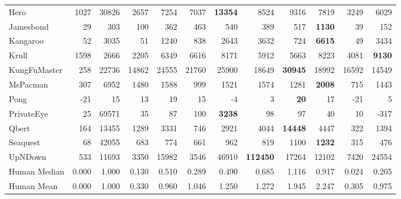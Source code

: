 \begin{tabular}{l|rr|rrrrrrrr|r}
    Hero           & 1027   & 30826 & 2657   & 7254  & 7037  & \bf 13354 & 8524       & 9316      & 7819      & 3249      & 6029     \\
    Jamesbond      & 29     & 303   & 100    & 362   & 463   & 540       & 389        & 517       & \bf 1130  & 39        & 152      \\
    Kangaroo       & 52     & 3035  & 51     & 1240  & 838   & 2643      & 3632       & 724       & \bf 6615  & 49        & 3434     \\
    Krull          & 1598   & 2666  & 2205   & 6349  & 6616  & 8171      & 5912       & 5663      & 8223      & 4081      & \bf 9130 \\
    KungFuMaster   & 258    & 22736 & 14862  & 24555 & 21760 & 25900     & 18649      & \bf 30945 & 18992     & 16592     & 14549    \\
    MsPacman       & 307    & 6952  & 1480   & 1588  & 999   & 1521      & 1574       & 1281      & \bf 2008  & 715       & 1443     \\
    Pong           & -21    & 15    & 13     & 19    & 15    & -4        & 3          & \bf 20    & 17        & -21       & 5        \\
    PrivateEye     & 25     & 69571 & 35     & 87    & 100   & \bf 3238  & 98         & 97        & 40        & 10        & -317     \\
    Qbert          & 164    & 13455 & 1289   & 3331  & 746   & 2921      & 4044       & \bf 14448 & 4447      & 322       & 1394     \\
    Seaquest       & 68     & 42055 & 683    & 774   & 661   & 962       & 819        & 1100      & \bf 1232  & 315       & 476      \\
    UpNDown        & 533    & 11693 & 3350   & 15982 & 3546  & 46910     & \bf 112450 & 17264     & 12102     & 7420      & 24554    \\
    \midrule
    Human Median   & 0.000  & 1.000 & 0.130  & 0.510 & 0.289 & 0.490     & 0.685      & 1.116     & 0.917     & 0.024     & 0.205    \\
    Human Mean     & 0.000  & 1.000 & 0.330  & 0.960 & 1.046 & 1.250     & 1.272      & 1.945     & 2.247     & 0.305     & 0.975    \\
    \bottomrule
\end{tabular}
